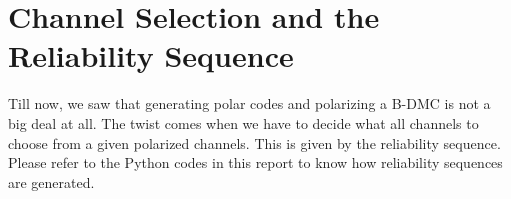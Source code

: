 \documentclass{article}
\begin{document}
\section{Channel Selection and the Reliability Sequence}
Till now, we saw that generating polar codes and polarizing a B-DMC is not a big deal at all. The twist comes when we have to decide what all channels to choose from a given polarized channels. This is given by the reliability sequence. Please refer to the Python codes in this report to know how reliability sequences are generated.
\end{document}
